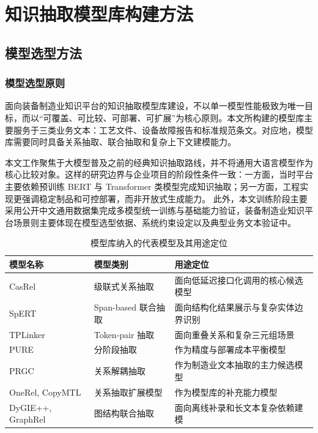 \chapter{知识抽取模型库构建方法}

\section{模型选型方法}
\subsection{模型选型原则}
面向装备制造业知识平台的知识抽取模型库建设，不以单一模型性能极致为唯一目标，而以“可覆盖、可比较、可部署、可扩展”为核心原则。本文所构建的模型库主要服务于三类业务文本：工艺文件、设备故障报告和标准规范条文。对应地，模型库需要同时具备关系抽取、联合抽取和复杂上下文建模能力。

本文工作聚焦于大模型普及之前的经典知识抽取路线，并不将通用大语言模型作为核心比较对象。这样的研究边界与企业项目的阶段性条件一致：一方面，当时平台主要依赖预训练 BERT 与 Transformer 类模型完成知识抽取；另一方面，工程实现更强调稳定制品和可控部署，而非开放式生成能力。
此外，本文训练阶段主要采用公开中文通用数据集完成多模型统一训练与基础能力验证，装备制造业知识平台场景则主要体现在模型选型依据、系统约束设定以及典型业务文本验证中。

\begin{table}[htbp]
  \centering
  \caption{模型库纳入的代表模型及其用途定位}
  \vspace{0.5em}\wuhao
  \begin{tabularx}{\textwidth}{l l X}
    \toprule
    模型名称 & 模型类别 & 用途定位 \\
    \midrule
    CasRel & 级联式关系抽取 & 面向低延迟接口化调用的核心候选模型 \\
    SpERT & Span-based 联合抽取 & 面向结构化结果展示与复杂实体边界识别 \\
    TPLinker & Token-pair 抽取 & 面向重叠关系和复杂三元组场景 \\
    PURE & 分阶段抽取 & 作为精度与部署成本平衡模型 \\
    PRGC & 关系解耦抽取 & 作为制造业文本抽取的主力候选模型 \\
    OneRel, CopyMTL & 关系抽取扩展模型 & 作为模型库的补充能力模型 \\
    DyGIE++, GraphRel & 图结构联合抽取 & 面向离线补录和长文本复杂依赖建模 \\
    \bottomrule
  \end{tabularx}
\label{tab:model_library_scope}
\end{table}

